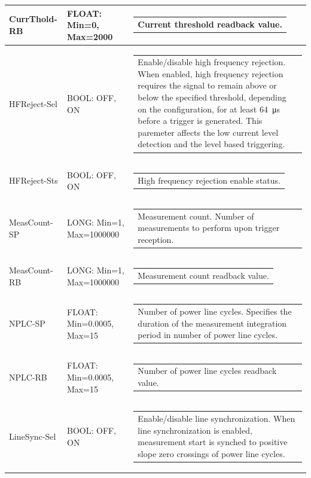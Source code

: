 \documentclass[openany]{article}
\begin{document}
\begin{longtable}{| m{3.0cm} m{4.5cm} m{7.0cm} |}
		CurrThold-RB & FLOAT: Min=0, Max=2000 & \begin{tabular}{@{}m{6cm}@{}}
	    					Current threshold readback value.
						\end{tabular} \\ \hline
		HFReject-Sel & BOOL: OFF, ON & \begin{tabular}{@{}m{6cm}@{}}
	    					Enable/disable high frequency rejection. When enabled, high frequency rejection requires the signal to remain above or below the specified threshold, depending on the configuration, for at least \SI{64}{\micro\second} before a trigger is generated. This paremeter affects the low current level detection and the level based triggering.
						\end{tabular} \\ \hline
		HFReject-Sts & BOOL: OFF, ON & \begin{tabular}{@{}m{6cm}@{}}
	    					High frequency rejection enable status.
						\end{tabular} \\ \hline
		MeasCount-SP & LONG: Min=1, Max=1000000 & \begin{tabular}{@{}m{6cm}@{}}
	    					Measurement count. Number of measurements to perform upon trigger reception.
						\end{tabular} \\ \hline
		MeasCount-RB & LONG: Min=1, Max=1000000 & \begin{tabular}{@{}m{6cm}@{}}
	    					Measurement count readback value.
						\end{tabular} \\ \hline
		NPLC-SP & FLOAT: Min=0.0005, Max=15 & \begin{tabular}{@{}m{6cm}@{}}
	    					Number of power line cycles. Specifies the duration of the measurement integration period in number of power line cycles.
						\end{tabular} \\ \hline
		NPLC-RB & FLOAT: Min=0.0005, Max=15 & \begin{tabular}{@{}m{6cm}@{}}
	    					Number of power line cycles readback value.
						\end{tabular} \\ \hline
		LineSync-Sel & BOOL: OFF, ON & \begin{tabular}{@{}m{6cm}@{}}
	    					Enable/disable line synchronization. When line synchronization is enabled, measurement start is synched to positive slope zero crossings of power line cycles.

\end{tabular}
\end{longtable}
\end{document}
